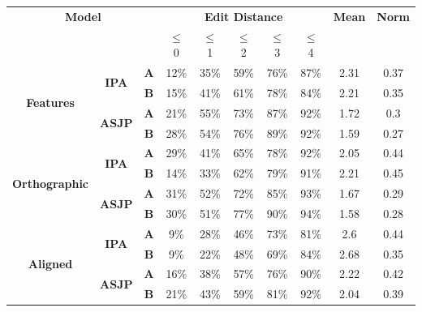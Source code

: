 \begin{table}
\centering
\begin{tabular}{c|c|c|ccccc|cc}
    \hline
    \multicolumn{3}{c|}{\textbf{Model}} & \multicolumn{5}{c|}{\textbf{Edit Distance}} & \textbf{Mean} & \textbf{Norm} \\
    \multicolumn{3}{c|}{} & \textbf{$\leq$} 0 & \textbf{$\leq$} 1 & \textbf{$\leq$} 2 & \textbf{$\leq$} 3 & \textbf{$\leq$} 4 & \\
    \hline
    
    \multirow{4}{*}{\textbf{Features}} 
        & \multirow{2}{*}{\textbf{IPA}} 
            &  \textbf{A} & 12\% & 35\% & 59\% & 76\% & 87\% & 2.31 & 0.37 \\
            && \textbf{B} & 15\% & 41\% & 61\% & 78\% & 84\% & 2.21 & 0.35 \\
        \cline{2-10}
        & \multirow{2}{*}{\textbf{ASJP}}
            &  \textbf{A} & 21\% & 55\% & 73\% & 87\% & 92\% & 1.72 & 0.3 \\
            && \textbf{B} & 28\% & 54\% & 76\% & 89\% & 92\% & 1.59 & 0.27 \\
    \hline
    
    \multirow{4}{*}{\textbf{Orthographic}} 
        & \multirow{2}{*}{\textbf{IPA}} 
            &  \textbf{A} & 29\% & 41\% & 65\% & 78\% & 92\% & 2.05 & 0.44 \\
            && \textbf{B} & 14\% & 33\% & 62\% & 79\% & 91\% & 2.21 & 0.45 \\
        \cline{2-10}
        & \multirow{2}{*}{\textbf{ASJP}}
            &  \textbf{A} & 31\% & 52\% & 72\% & 85\% & 93\% & 1.67 & 0.29 \\
            && \textbf{B} & 30\% & 51\% & 77\% & 90\% & 94\% & 1.58 & 0.28 \\
    \hline
    
     \multirow{4}{*}{\textbf{Aligned}} 
        & \multirow{2}{*}{\textbf{IPA}} 
            &  \textbf{A} & 9\% & 28\% & 46\% & 73\% & 81\% & 2.6 & 0.44 \\
            && \textbf{B} & 9\% & 22\% & 48\% & 69\% & 84\% & 2.68 & 0.35 \\
        \cline{2-10}
        & \multirow{2}{*}{\textbf{ASJP}}
            &  \textbf{A} & 16\% & 38\% & 57\% & 76\% & 90\% & 2.22 & 0.42 \\
            && \textbf{B} & 21\% & 43\% & 59\% & 81\% & 92\% & 2.04 & 0.39 \\
    \hline
    

\end{tabular}
\end{table}
